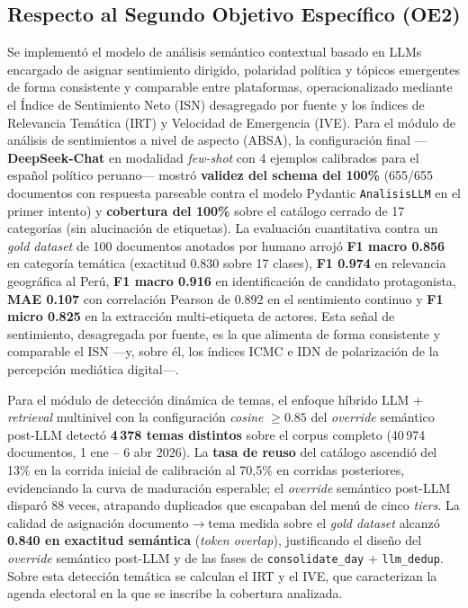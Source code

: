 \subsection*{Respecto al Segundo Objetivo Específico (OE2)}
Se implementó el modelo de análisis semántico contextual basado en LLMs encargado de asignar sentimiento dirigido, polaridad política y tópicos emergentes de forma consistente y comparable entre plataformas, operacionalizado mediante el Índice de Sentimiento Neto (ISN) desagregado por fuente y los índices de Relevancia Temática (IRT) y Velocidad de Emergencia (IVE). Para el módulo de análisis de sentimientos a nivel de aspecto (ABSA), la configuración final —\textbf{DeepSeek-Chat} en modalidad \textit{few-shot} con 4 ejemplos calibrados para el español político peruano— mostró \textbf{validez del schema del 100\%} (655/655 documentos con respuesta parseable contra el modelo Pydantic \texttt{AnalisisLLM} en el primer intento) y \textbf{cobertura del 100\%} sobre el catálogo cerrado de 17 categorías (sin alucinación de etiquetas). La evaluación cuantitativa contra un \textit{gold dataset} de 100 documentos anotados por humano arrojó \textbf{F1 macro 0.856} en categoría temática (exactitud 0.830 sobre 17 clases), \textbf{F1 0.974} en relevancia geográfica al Perú, \textbf{F1 macro 0.916} en identificación de candidato protagonista, \textbf{MAE 0.107} con correlación Pearson de 0.892 en el sentimiento continuo y \textbf{F1 micro 0.825} en la extracción multi-etiqueta de actores. Esta señal de sentimiento, desagregada por fuente, es la que alimenta de forma consistente y comparable el ISN —y, sobre él, los índices ICMC e IDN de polarización de la percepción mediática digital—.

Para el módulo de detección dinámica de temas, el enfoque híbrido LLM + \textit{retrieval} multinivel con la configuración \textit{cosine} $\geq 0.85$ del \textit{override} semántico post-LLM detectó \textbf{4\,378 temas distintos} sobre el corpus completo (40\,974 documentos, 1 ene -- 6 abr 2026). La \textbf{tasa de reuso} del catálogo ascendió del 13\% en la corrida inicial de calibración al 70{,}5\% en corridas posteriores, evidenciando la curva de maduración esperable; el \textit{override} semántico post-LLM disparó 88 veces, atrapando duplicados que escapaban del menú de cinco \textit{tiers}. La calidad de asignación documento$\rightarrow$tema medida sobre el \textit{gold dataset} alcanzó \textbf{0.840 en exactitud semántica} (\textit{token overlap}), justificando el diseño del \textit{override} semántico post-LLM y de las fases de \texttt{consolidate\_day} + \texttt{llm\_dedup}. Sobre esta detección temática se calculan el IRT y el IVE, que caracterizan la agenda electoral en la que se inscribe la cobertura analizada.

